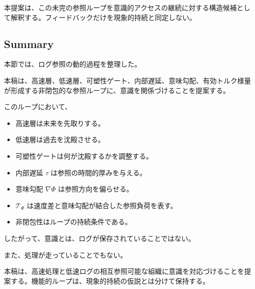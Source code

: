 本提案は、この未完の参照ループを意識的アクセスの継続に対する構造候補として解釈する。フィードバックだけを現象的持続と同定しない。

\subsection{Summary}

本節では、ログ参照の動的過程を整理した。

本稿は、高速層、低速層、可塑性ゲート、内部遅延、意味勾配、有効トルク様量が形成する非閉包的な参照ループに、意識を関係づけることを提案する。

このループにおいて、

\begin{itemize}
\item 高速層は未来を先取りする。
\item 低速層は過去を沈殿させる。
\item 可塑性ゲートは何が沈殿するかを調整する。
\item 内部遅延 $\tau$ は参照の時間的厚みを与える。
\item 意味勾配 $\nabla \Phi$ は参照方向を偏らせる。
\item $\mathcal{T}_{\Phi}$ は速度差と意味勾配が結合した参照負荷を表す。
\item 非閉包性はループの持続条件である。
\end{itemize}

したがって、意識とは、ログが保存されていることではない。

また、処理が走っていることでもない。

本稿は、高速処理と低速ログの相互参照可能な組織に意識を対応づけることを提案する。機能的ループは、現象的持続の仮説とは分けて保持する。
